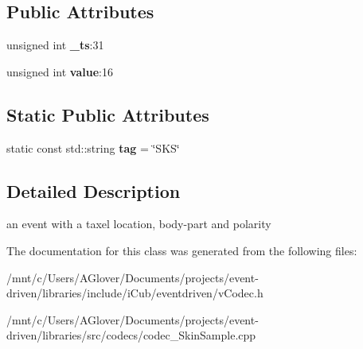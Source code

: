 \subsection*{Public Attributes}
\begin{DoxyCompactItemize}
\item 
\mbox{\label{classev_1_1SkinSample_ac1f3f8035d23ba4450b1e852f3422825}} 
unsigned int {\bfseries \+\_\+ts}\+:31
\item 
\mbox{\label{classev_1_1SkinSample_a23534f3787cad7c9d1c8c2ba8bf5bbf4}} 
unsigned int {\bfseries value}\+:16
\end{DoxyCompactItemize}
\subsection*{Static Public Attributes}
\begin{DoxyCompactItemize}
\item 
\mbox{\label{classev_1_1SkinSample_a40d0036de84cc8071b85157fccb2db54}} 
static const std\+::string {\bfseries tag} = \char`\"{}S\+KS\char`\"{}
\end{DoxyCompactItemize}


\subsection{Detailed Description}
an event with a taxel location, body-\/part and polarity 

The documentation for this class was generated from the following files\+:\begin{DoxyCompactItemize}
\item 
/mnt/c/\+Users/\+A\+Glover/\+Documents/projects/event-\/driven/libraries/include/i\+Cub/eventdriven/v\+Codec.\+h\item 
/mnt/c/\+Users/\+A\+Glover/\+Documents/projects/event-\/driven/libraries/src/codecs/codec\+\_\+\+Skin\+Sample.\+cpp\end{DoxyCompactItemize}
